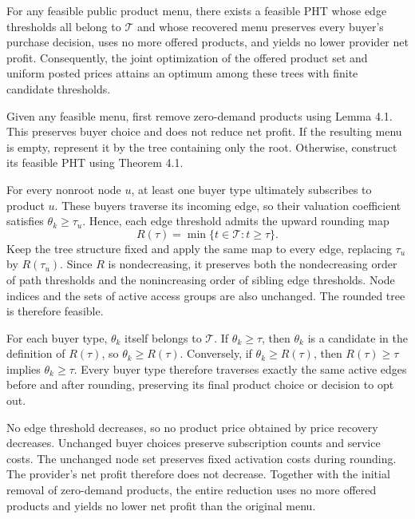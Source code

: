 \begin{theorem}\label{thm:finite_threshold}
For any feasible public product menu, there exists a feasible PHT whose edge thresholds all belong to $\mathcal T$ and whose recovered menu preserves every buyer's purchase decision, uses no more offered products, and yields no lower provider net profit. Consequently, the joint optimization of the offered product set and uniform posted prices attains an optimum among these trees with finite candidate thresholds.
\end{theorem}

\begin{IEEEproof}
Given any feasible menu, first remove zero-demand products using Lemma 4.1. This preserves buyer choice and does not reduce net profit. If the resulting menu is empty, represent it by the tree containing only the root. Otherwise, construct its feasible PHT using Theorem 4.1.

For every nonroot node $u$, at least one buyer type ultimately subscribes to product $u$. These buyers traverse its incoming edge, so their valuation coefficient satisfies $\theta_k\ge\tau_u$. Hence, each edge threshold admits the upward rounding map
\begin{equation}
R(\tau)=\min\{t\in\mathcal T:t\ge\tau\}.
\label{eq:s4_12}
\tag{S2}
\end{equation} Keep the tree structure fixed and apply the same map to every edge, replacing $\tau_u$ by $R(\tau_u)$. Since $R$ is nondecreasing, it preserves both the nondecreasing order of path thresholds and the nonincreasing order of sibling edge thresholds. Node indices and the sets of active access groups are also unchanged. The rounded tree is therefore feasible.

For each buyer type, $\theta_k$ itself belongs to $\mathcal T$. If $\theta_k\ge\tau$, then $\theta_k$ is a candidate in the definition of $R(\tau)$, so $\theta_k\ge R(\tau)$. Conversely, if $\theta_k\ge R(\tau)$, then $R(\tau)\ge\tau$ implies $\theta_k\ge\tau$. Every buyer type therefore traverses exactly the same active edges before and after rounding, preserving its final product choice or decision to opt out.

No edge threshold decreases, so no product price obtained by price recovery decreases. Unchanged buyer choices preserve subscription counts and service costs. The unchanged node set preserves fixed activation costs during rounding. The provider's net profit therefore does not decrease. Together with the initial removal of zero-demand products, the entire reduction uses no more offered products and yields no lower net profit than the original menu.


\end{IEEEproof}
